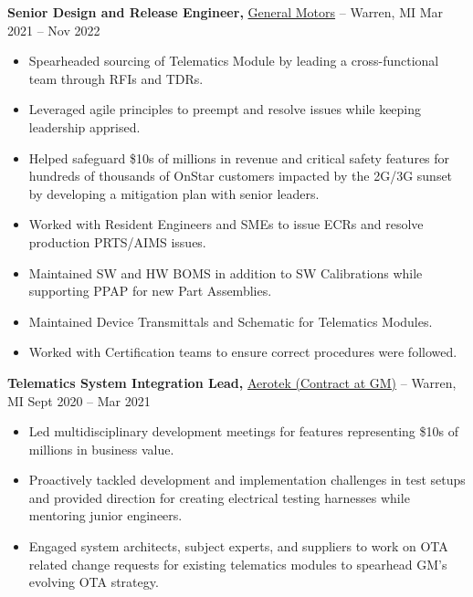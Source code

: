 \documentclass[11pt]{article}       %
\begin{document}
\textbf{Senior Design and Release Engineer,} \href{}{General Motors} -- Warren, MI \hfill Mar 2021 -- Nov 2022 \\
\vspace{-9pt}
\begin{itemize}
  \item Spearheaded sourcing of Telematics Module by leading a cross-functional team through RFIs and TDRs.
  \item Leveraged agile principles to preempt and resolve issues while keeping leadership apprised.
  \item Helped safeguard \$10s of millions in revenue and critical safety features for hundreds of thousands of OnStar customers impacted by the 2G/3G sunset by developing a mitigation plan with senior leaders.
  \item Worked with Resident Engineers and SMEs to issue ECRs and resolve production PRTS/AIMS issues.
  \item Maintained SW and HW BOMS in addition to SW Calibrations while supporting PPAP for new Part Assemblies.
  \item Maintained Device Transmittals and Schematic for Telematics Modules.
  \item Worked with Certification teams to ensure correct procedures were followed.
\end{itemize}

\textbf{Telematics System Integration Lead,} \href{}{Aerotek (Contract at GM)} -- Warren, MI \hfill Sept 2020 -- Mar 2021 \\
\vspace{-9pt}
\begin{itemize}
  \item Led multidisciplinary development meetings for features representing \$10s of millions in business value.
  \item Proactively tackled development and implementation challenges in test setups and provided direction for creating electrical testing harnesses while mentoring junior engineers.
  \item Engaged system architects, subject experts, and suppliers to work on OTA related change requests for existing telematics modules to spearhead GM’s evolving OTA strategy.
\end{itemize}
\end{document}
